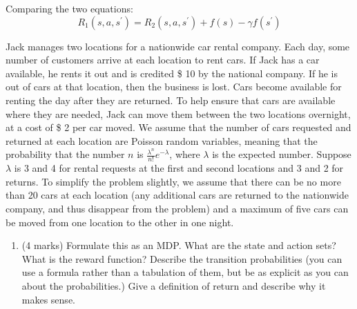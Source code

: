 \documentclass[addpoints,12pt,solution]{exam}
\begin{document}
\begin{questions}
\begin{enumerate}[label=(\alph*)]
\begin{solution}
                Comparing the two equations:
                \[
                    R_1(s, a, s^\prime) = R_2(s, a, s^\prime) + f(s) - \gamma f(s^\prime)
                \]
            \end{solution}

        \end{enumerate}



         Jack manages two locations for a nationwide car rental company. Each day, some number of customers arrive at each location to rent cars. If Jack has a car available, he rents it out and is credited \$ 10 by the national company. If he is out of cars at that location, then the business is lost. Cars become available for renting the day after they are returned. To help ensure that cars are available where they are needed, Jack can move them between the two locations overnight, at a cost of \$ 2 per car moved. We assume that the number of cars requested and returned at each location are Poisson random variables, meaning that the probability that the number $n$ is $\frac{\lambda^n}{n!}e^{-\lambda}$, where $\lambda$ is the expected number. Suppose $\lambda$ is 3 and 4 for rental requests at the first and second locations and 3 and 2 for returns. To simplify the problem slightly, we assume that there can be no more than 20 cars at each location (any additional cars are returned to the nationwide company, and thus disappear from the problem) and a
        maximum of five cars can be moved from one location to the other in one night.

        \begin{enumerate}[label=(\alph*)]

            \item (4 marks) Formulate this as an MDP. What are the state and action sets? What is the reward function? Describe the transition probabilities (you can use a formula rather than a tabulation of them, but be as explicit as you can about the probabilities.) Give a definition of return and describe why it makes sense.


\end{enumerate}
\end{questions}
\end{document}
